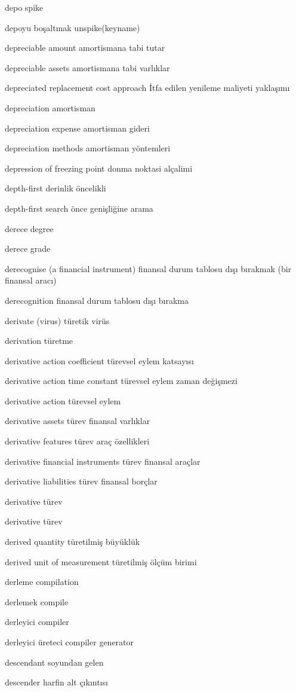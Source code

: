 \documentclass[12pt,fleqn]{article}\usepackage{../../common}
\begin{document}
depo spike

depoyu boşaltmak unspike(keyname)

depreciable amount amortismana tabi tutar

depreciable assets amortismana tabi varlıklar

depreciated replacement cost approach İtfa edilen yenileme maliyeti yaklaşımı

depreciation amortisman

depreciation expense amortisman gideri

depreciation methods amortisman yöntemleri

depression of freezing point donma noktasi alçalimi

depth-first derinlik öncelikli

depth-first search önce genişliğine arama

derece degree

derece grade

derecognise (a financial instrument) finansal durum tablosu dışı bırakmak (bir finansal aracı)

derecognition finansal durum tablosu dışı bırakma

derivate (virus) türetik virüs

derivation türetme

derivative action coefficient türevsel eylem katsayısı

derivative action time constant türevsel eylem zaman değişmezi

derivative action türevsel eylem

derivative assets türev finansal varlıklar

derivative features türev araç özellikleri

derivative financial instruments türev finansal araçlar

derivative liabilities türev finansal borçlar

derivative türev

derivative türev

derived quantity türetilmiş büyüklük

derived unit of measurement türetilmiş ölçüm birimi

derleme compilation

derlemek compile

derleyici compiler

derleyici üreteci compiler generator

descendant soyundan gelen

descender harfin alt çıkıntısı
\end{document}
